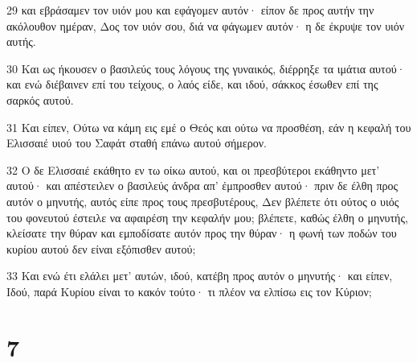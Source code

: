 \par 29 και εβράσαμεν τον υιόν μου και εφάγομεν αυτόν· είπον δε προς αυτήν την ακόλουθον ημέραν, Δος τον υιόν σου, διά να φάγωμεν αυτόν· η δε έκρυψε τον υιόν αυτής.
\par 30 Και ως ήκουσεν ο βασιλεύς τους λόγους της γυναικός, διέρρηξε τα ιμάτια αυτού· και ενώ διέβαινεν επί του τείχους, ο λαός είδε, και ιδού, σάκκος έσωθεν επί της σαρκός αυτού.
\par 31 Και είπεν, Ούτω να κάμη εις εμέ ο Θεός και ούτω να προσθέση, εάν η κεφαλή του Ελισσαιέ υιού του Σαφάτ σταθή επάνω αυτού σήμερον.
\par 32 Ο δε Ελισσαιέ εκάθητο εν τω οίκω αυτού, και οι πρεσβύτεροι εκάθηντο μετ' αυτού· και απέστειλεν ο βασιλεύς άνδρα απ' έμπροσθεν αυτού· πριν δε έλθη προς αυτόν ο μηνυτής, αυτός είπε προς τους πρεσβυτέρους, Δεν βλέπετε ότι ούτος ο υιός του φονευτού έστειλε να αφαιρέση την κεφαλήν μου; βλέπετε, καθώς έλθη ο μηνυτής, κλείσατε την θύραν και εμποδίσατε αυτόν προς την θύραν· η φωνή των ποδών του κυρίου αυτού δεν είναι εξόπισθεν αυτού;
\par 33 Και ενώ έτι ελάλει μετ' αυτών, ιδού, κατέβη προς αυτόν ο μηνυτής· και είπεν, Ιδού, παρά Κυρίου είναι το κακόν τούτο· τι πλέον να ελπίσω εις τον Κύριον;

\chapter{7}

